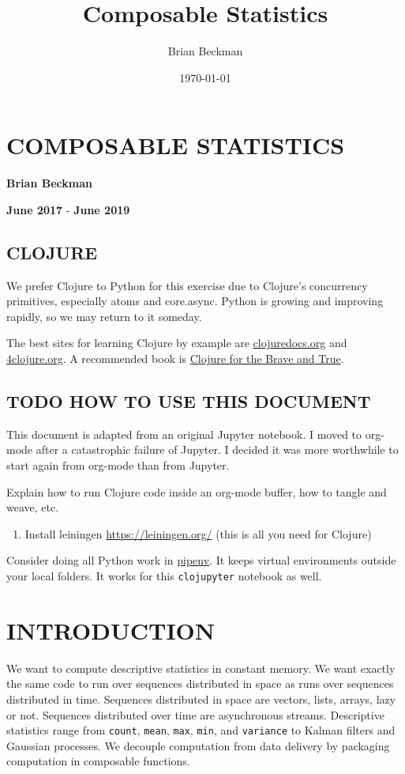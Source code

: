 \documentclass[10pt,oneside,x11names]{article}
\author{Brian Beckman}
\date{\today}
\title{Composable Statistics}
\begin{document}
\maketitle
\setcounter{tocdepth}{2}
\tableofcontents


\section{COMPOSABLE STATISTICS}
\label{composable-statistics}
\textbf{Brian Beckman}

\textbf{June 2017} - \textbf{June 2019}

\subsection{CLOJURE}
\label{clojure}
We prefer Clojure to Python for this exercise due to Clojure's
concurrency primitives, especially atoms and core.async. Python is
growing and improving rapidly, so we may return to it someday.

The best sites for learning Clojure by example are
\href{http://clojuredocs.org}{clojuredocs.org} and
\href{http://4clojure.org}{4clojure.org}. A recommended book is
\href{http://braveclojure.com}{Clojure for the Brave and True}.

\subsection{{\bfseries\sffamily TODO} HOW TO USE THIS DOCUMENT}
\label{how-to-use-this-document}
This document is adapted from an original Jupyter notebook. I moved to
org-mode after a catastrophic failure of Jupyter. I decided it was more
worthwhile to start again from org-mode than from Jupyter.

Explain how to run Clojure code inside an org-mode buffer, how to tangle and
weave, etc.


\begin{enumerate}
\item Install leiningen \url{https://leiningen.org/} (this is all you need for Clojure)
\end{enumerate}

Consider doing all Python work in \href{https://pipenv.readthedocs.io/}{pipenv}. It keeps virtual environments outside
your local folders. It works for this \texttt{clojupyter} notebook as well.

\section{INTRODUCTION}
\label{introduction}
We want to compute descriptive statistics in constant memory. We want
exactly the same code to run over sequences distributed in space as runs
over sequences distributed in time. Sequences distributed in space are
vectors, lists, arrays, lazy or not. Sequences distributed over time are
asynchronous streams. Descriptive statistics range from \texttt{count}, \texttt{mean},
\texttt{max}, \texttt{min}, and \texttt{variance} to Kalman filters and Gaussian processes.
We decouple computation from data delivery by packaging computation in
composable functions.
\end{document}
